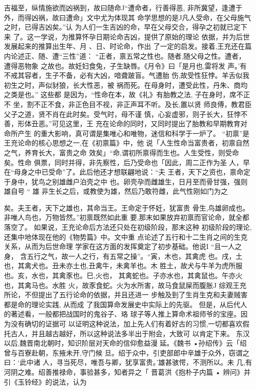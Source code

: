吉福至，纵情施欲而凶祸到，故曰随命J“遭命者，行善得恶,
非所冀望，逢遭于外，而得凶祸，故曰遭命」文中尤为体现其
命学思想的是J凡人受命，在父母施气之时，已得吉凶矣。”认
为人们一生吉凶的命，早在父母交合，得孕之初就已定下来
了。这一学说，为推算怀孕日期论命吉凶，提供了原始的理论
依据，并为后世发展起来的推算出生年、月 、日、时论命，作出
了一定的启发。接着,王充还在篇内论述正、随、遭“三性”道：
“正者，禀五常之性也。随者,随父母之性。遭者，遭得恶物象
之故也。故妊妇食兔，子生缺唇。《月令》曰「是月也,雷将发
声。'有不戒其容者，生子不备，必有大凶，喑聋跛盲。气遭胎
伤,故受性狂悖。羊舌似我初生之时，声似豺狼，长大性恶，被
祸而死。在母身时，遭受此性，丹朱、商均之类是也。” 这些都
是因为，“性命在本，故《礼》有胎教之法, 子在身时，席不正不
坐，割不正不食，非正色目不视，非正声耳不听。及长,置以贤
师良傅，教君臣父子之道，贤不肖在此时矣。受气时，母不谨
慎，心妄虚邪，则子长大，狂悖不善，形体丑恶。”可见这里，王
充在论命的同时，又同时提出了胎教和早期教育对命所产生
的重大影响，真可谓是集唯心和唯物，迷信和科学于一炉了。
“初禀”是王充论命的核心思想之一,在《初禀篇》中，他
说「人生性命当富贵者，初禀自然之气，养育长大，富贵之命
效矣」“命,谓初所禀得而生也。人生受性，则受命矣。性命
俱票，同时并得，非先察性，后乃受命也「因此，周二正作为圣
人，早在“母身之中已受命”了。此后他还才想联翩地说：“夫
王者，天下之资也，禀命定于身中，犹鸟之别雄雌户泊壳之中
也。卵壳孕而雌雄生，日月至而骨甘强，强则雄自号 “ 雄
非生长之后，或教使为雄，然后乃敢符雌，此气性刚如门为之


矣。夫王者，天下之雄也，其命当王。王命定于怀妊，犹富贵
骨生,鸟雄卵成也。非唯人鸟也，万物皆然。”初禀既然如此重
要,那末如果放弃初禀而官论命，就全都落空了。
如果说，王充论命后方法还只处在初级阶段，那末这种
初级阶段的理论,还集中地体现在他的《物势篇》中。文中重
点论述了五行和十二生肖之间的生克关系，从而为后世命理
学家在这方面的发挥奠定了初步基础。他说I “且一人之身，
含五行之气，故一人之行，有五常之操”。“寅，木也，其禽虎
也。戌，土也，其禽犬也。丑未亦土也,丑禽牛，未禽羊也。木
胜土，故犬与牛羊为虎所服也。亥，水也，其禽豕也。巳,火也，
其禽蛇也。子亦水也，其禽鼠也。午亦火也，其禽马也。水胜
火，故豕食蛇。火为水所害，故马食鼠屎而腹胀J
综观王充所论，不但提出了五行论命的依据，并且还进一
步触及到了生肖生克和夫妻贼害都是命的理论实践, 从而成
了我国算命发展史中实际上的先驱。
但是，从后代人的著述看，一般都把战国时的鬼谷子、珞
球子等人推上算命术祖师爷的宝座。因为没有确切的证据可
以证明这种说法，加上先人们有着好古的习惯,一切都喜欢假
托古人，并且越古越好，所以这种说法多半出于附会，大致可
以肯定下来。
东汉以后,魏晋南北朝时，知识阶层对天命的信仰愈益漫
延。《魏书 •孙绍传》云「绍曾与百寮赴朝，东掖未开,守门候
旦。绍于众中，引吏部郎中辛雄于众外，窃谓之曰：‘此中诸
人，寻当死尽，唯吾与卿，犹享富贵。'雄甚骇愕，不测所以。未
几,有河阴之难。绍善推禄命，事验甚多，知者异之「
晋葛洪《抱朴子内篇 • 辨问》并引《玉铃经》的说法，认为

